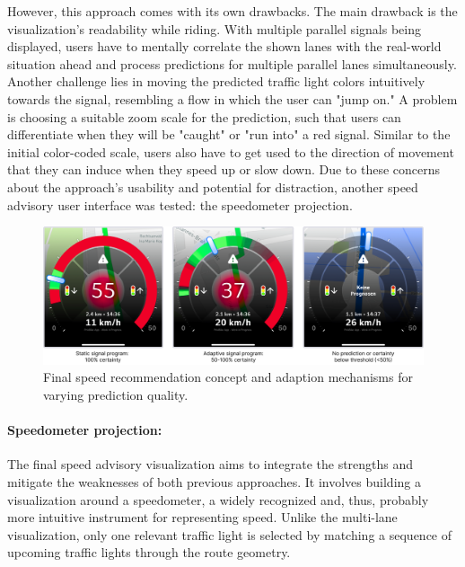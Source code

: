However, this approach comes with its own drawbacks. The main drawback is the visualization's readability while riding. With multiple parallel signals being displayed, users have to mentally correlate the shown lanes with the real-world situation ahead and process predictions for multiple parallel lanes simultaneously. Another challenge lies in moving the predicted traffic light colors intuitively towards the signal, resembling a flow in which the user can "jump on." A problem is choosing a suitable zoom scale for the prediction, such that users can differentiate when they will be "caught" or "run into" a red signal. Similar to the initial color-coded scale, users also have to get used to the direction of movement that they can induce when they speed up or slow down. Due to these concerns about the approach's usability and potential for distraction, another speed advisory user interface was tested: the speedometer projection.

\begin{figure}[htbp]
\centering
\includegraphics[width=\linewidth]{images/speedometer-adaptions.png}
\caption{Final speed recommendation concept and adaption mechanisms for varying prediction quality.}
\label{fig:speedometer-adaptions}
\end{figure}

\paragraph{Speedometer projection:} The final speed advisory visualization aims to integrate the strengths and mitigate the weaknesses of both previous approaches. It involves building a visualization around a speedometer, a widely recognized and, thus, probably more intuitive instrument for representing speed. Unlike the multi-lane visualization, only one relevant traffic light is selected by matching a sequence of upcoming traffic lights through the route geometry.

